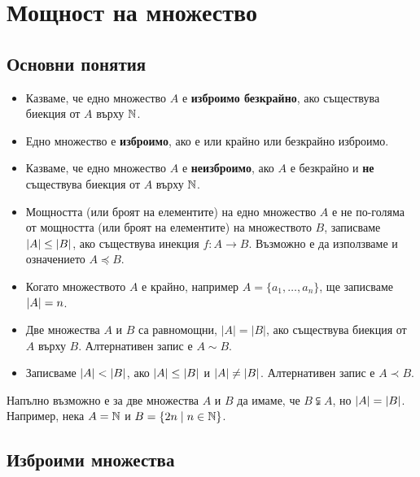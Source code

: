 \chapter{Мощност на множество}

\section{Основни понятия}

\begin{itemize}
\item 
  Казваме, че едно множество $A$ е {\bf изброимо безкрайно}, ако съществува 
  биекция от $A$ върху $\mathbb{N}$.
\item
  Едно множество е {\bf изброимо}, ако е или крайно или безкрайно изброимо.
\item
  Казваме, че едно множество $A$ е {\bf неизброимо}, ако $A$ е безкрайно и {\bf не} съществува 
  биекция от $A$ върху $\mathbb{N}$.
\item
  Мощността (или броят на елементите) на едно множество $A$ е не по-голяма от мощността (или броят на елементите) на множеството $B$, 
  записваме $\lvert{A}\rvert \leq \lvert{B}\rvert$, ако съществува инекция $f:A \to B$.
  Възможно е да използваме и означението $A \preceq B$.
\item
  Когато множеството $A$ е крайно, например $A = \{a_1,\dots,a_n\}$, 
  ще записваме $\lvert{A}\rvert = n$.
\item
  Две множества $A$ и $B$ са равномощни, $|A| = |B|$, ако съществува биекция от $A$ върху $B$.
  Алтернативен запис е $A \sim B$.
\item
  Записваме $\lvert{A}\rvert < \lvert{B}\rvert$, ако $\lvert{A}\rvert \leq \lvert{B}\rvert$ и $\lvert{A}\rvert \neq \lvert{B}\rvert$.
  Алтернативен запис е $A \prec B$.
\end{itemize}

\begin{framed}
\begin{remark}
  Напълно възможно е за две множества $A$ и $B$ да имаме, че  $B \subsetneqq A$, но $\lvert{A}\rvert = \lvert{B}\rvert$.
  Например, нека $A = \mathbb{N}$ и $B = \{2n\mid n\in\mathbb{N}\}$.
\end{remark}
\end{framed}


\section{Изброими множества}

